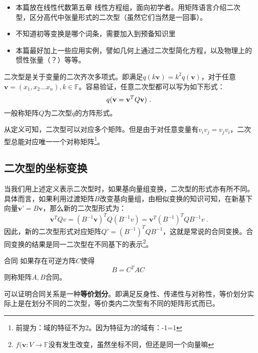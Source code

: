 
\begin{issues}
\issueTODO 
\begin{itemize}
\item 本篇放在线性代数第五章 线性方程组，面向初学者。用矩阵语言介绍二次型，区分高代中张量形式的二次型（虽然它们当然是一回事）。
\item 不知道初等变换是哪个词条，需要加入到预备知识里
\item  本篇最好加上一些应用实例，譬如几何上通过二次型简化方程，以及物理上的惯性张量（？）等等。
\end{itemize}
\end{issues}
\begin{definition}{}
二次型是关于变量的二次齐次多项式。即满足$q(k\textbf{v})=k^2 q(\textbf{v})$，对于任意$\textbf{v}=(x_1,x_2...x_n),k\in \mathbb F$。容易验证，任意二次型都可以写为如下形式：
\begin{equation}
q(\textbf{v}=\textbf{v}^TQ\textbf v)~.
\end{equation}
一般称矩阵$Q$为二次型$q$的方阵形式。
\end{definition}
从定义可知，二次型可以对应多个矩阵。但是由于对任意变量有$v_iv_j=v_jv_i$，二次型总能对应唯一一个对称矩阵\footnote{前提为：域的特征不为2。因为特征为2的域有：-1=1}。
\subsection{二次型的坐标变换}
当我们用上述定义表示二次型时，如果基向量组变换，二次型的形式亦有所不同。具体而言，如果利用过渡矩阵$B$改变基向量组，由相似变换的知识可知，在新基下向量$\textbf {v'}=B\textbf{v}$，那么新的二次型形式为：
\begin{equation}
\textbf{v}^T Qv=(B^{-1}\textbf{v})^T Q(B^{-1}v)=\textbf{v}^T (B^{-1})^{T}QB^{-1}v~.
\end{equation}
因此，新的二次型形式对应矩阵$Q'=(B^{-1})^{T}QB^{-1}$，这就是常说的合同变换。合同变换的结果是同一二次型在不同基下的表示\footnote{$f(\textbf{v}:V\rightarrow \mathbb F$没有发生改变，虽然坐标不同，但还是同一个向量嘛}。
\begin{definition}{合同}
如果存在可逆方阵$C$使得
\begin{equation}
B=C^T AC~
\end{equation}
则称矩阵$A,B$合同。
\end{definition}
可以证明合同关系是一种\textbf{等价划分}。即满足反身性、传递性与对称性，等价划分实际上是在划分不同的二次型，等价类内二次型有不同的矩阵形式而已。

